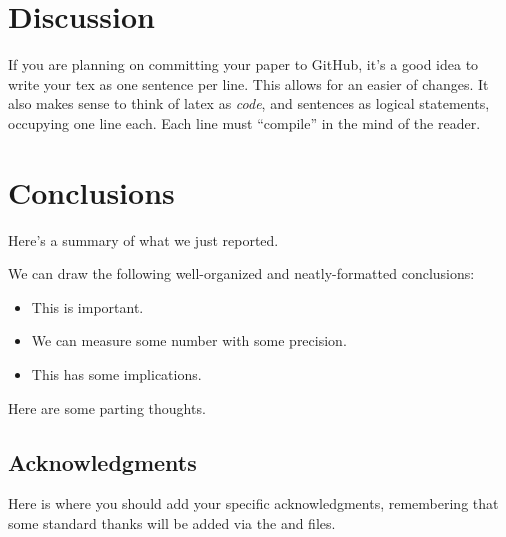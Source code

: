 \documentclass[\docopts]{\docclass}
\begin{document}

\section{Discussion}
\label{sec:discussion}

If you are planning on committing your paper to GitHub, it's a good idea to write your tex as one sentence per line.
This allows for an easier  of changes.
It also makes sense to think of latex as \emph{code}, and sentences as logical statements, occupying one line each.
Each line must ``compile'' in the mind of the reader.



\section{Conclusions}
\label{sec:conclusions}

Here's a summary of what we just reported.

We can draw the following well-organized and neatly-formatted conclusions:
\begin{itemize}
  \item This is important.
  \item We can measure some number with some precision.
  \item This has some implications.
\end{itemize}

Here are some parting thoughts.



\subsection*{Acknowledgments}

Here is where you should add your specific acknowledgments, remembering that some standard thanks will be added via the  and  files.


\end{document}
